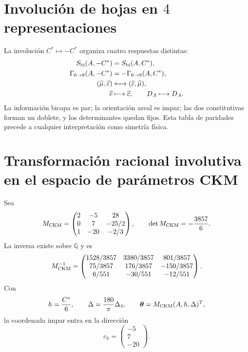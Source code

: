 \section{Involución de hojas en \(4\) representaciones}

La involuci\'on \(C^*\mapsto-C^*\) organiza cuatro respuestas distintas:
\begin{equation}
\label{eq:modular-sheet-parities}
\begin{aligned}
S_{\rm bi}(A,-C^*)&=S_{\rm bi}(A,C^*),\\
\Gamma_{6\to8}(A,-C^*)&=-\Gamma_{6\to8}(A,C^*),\\
(\widehat\mu,\widehat\varepsilon)&\longleftrightarrow
(\widehat\varepsilon,\widehat\mu),\\
\widehat c&\longmapsto\widehat c,
\qquad D_A\longmapsto D_A.
\end{aligned}
\end{equation}
La informaci\'on bicapa es par; la orientaci\'on areal es impar; las dos
constitutivas forman un doblete, y los determinantes quedan fijos. Esta tabla
de paridades precede a cualquier interpretaci\'on como simetr\'ia f\'isica.

\section{Transformaci\'on racional involutiva en el espacio de par\'ametros CKM}

Sea
\begin{equation}
\label{eq:modular-Mckm}
M_{\rm CKM}=
\begin{pmatrix}
2&-5&28\\
0&7&-25/2\\
1&-20&-2/3
\end{pmatrix},
\qquad
\det M_{\rm CKM}=-\frac{3857}{6}.
\end{equation}
La inversa existe sobre \(\mathbb Q\) y es
\begin{equation}
\label{eq:modular-Mckm-inverse}
M_{\rm CKM}^{-1}=
\begin{pmatrix}
1528/3857&3380/3857&801/3857\\
75/3857&176/3857&-150/3857\\
6/551&-30/551&-12/551
\end{pmatrix}.
\end{equation}
Con
\begin{equation}
\label{eq:modular-ckm-coordinates}
h=\frac{C^*}{6},
\qquad
\Delta=\frac{180}{\pi}\Delta_4,
\qquad
\boldsymbol\theta=M_{\rm CKM}(A,h,\Delta)^T,
\end{equation}
la coordenada impar entra en la direcci\'on
\begin{equation}
\label{eq:modular-ch}
c_h=\begin{pmatrix}-5\\7\\-20\end{pmatrix}.
\end{equation}

